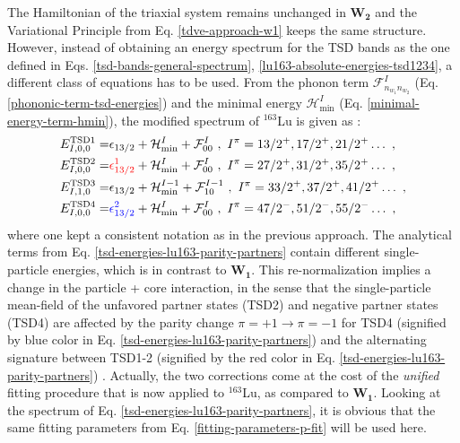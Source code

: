 The Hamiltonian of the triaxial system remains unchanged in $\mathbf{W_2}$ and the Variational Principle from Eq. \ref{tdve-approach-w1} keeps the same structure. However, instead of obtaining an energy spectrum  for the TSD bands as the one defined in Eqs. \ref{tsd-bands-general-spectrum}, \ref{lu163-absolute-energies-tsd1234}, a different class of equations has to be used. From the phonon term $\mathcal{F}_{n_{w_1}n_{w_2}}^I$ (Eq. \ref{phononic-term-tsd-energies}) and the minimal energy $\mathcal{H}_\text{min}^I$ (Eq. \ref{minimal-energy-term-hmin}), the modified spectrum of $^{163}$Lu is given as \cite{poenaru2021parity}:
\begin{align}
    E_{I,0,0}^\text{TSD1}=&\epsilon_{13/2}+\mathcal{H}_\text{min}^I+\mathcal{F}_{00}^I\nonumber\ ,\ I^\pi=13/2^+,17/2^+,21/2^+\dots\ ,\\
    E_{I,0,0}^\text{TSD2}=&{\color{red}\epsilon_{13/2}^1}+\mathcal{H}_\text{min}^I+\mathcal{F}_{00}^I\nonumber\ ,\ I^\pi=27/2^+,31/2^+,35/2^+\dots\ ,\\
    E_{I,1,0}^\text{TSD3}=&\epsilon_{13/2}+\mathcal{H}_\text{min}^{I-1}+\mathcal{F}_{10}^{I-1}\nonumber\ ,\ I^\pi=33/2^+,37/2^+,41/2^+\dots\ ,\\
    E_{I,0,0}^\text{TSD4}=&{\color{blue}\epsilon_{13/2}^2}+\mathcal{H}_\text{min}^I+\mathcal{F}_{00}^I\ ,\ I^\pi=47/2^-,51/2^-,55/2^-\dots\ ,
    \label{tsd-energies-lu163-parity-partners}
\end{align}
where one kept a consistent notation as in the previous approach. The analytical terms from Eq. \ref{tsd-energies-lu163-parity-partners} contain different single-particle energies, which is in contrast to $\mathbf{W_1}$. This re-normalization implies a change in the particle + core interaction, in the sense that the single-particle mean-field of the unfavored partner states (TSD2) and negative partner states (TSD4) are affected by the parity change $\pi=+1\to \pi=-1$ for TSD4 (signified by blue color in Eq. \ref{tsd-energies-lu163-parity-partners}) and the alternating signature between TSD1-2 (signified by the red color in Eq. \ref{tsd-energies-lu163-parity-partners}) \cite{poenaru2021parity,poenaru2021extensive1,poenaru2021extensive2}. Actually, the two corrections come at the cost of the \emph{unified} fitting procedure that is now applied to $^{163}$Lu, as compared to $\mathbf{W_1}$. Looking at the spectrum of Eq. \ref{tsd-energies-lu163-parity-partners}, it is obvious that the same fitting parameters from Eq. \ref{fitting-parameters-p-fit} will be used here.

